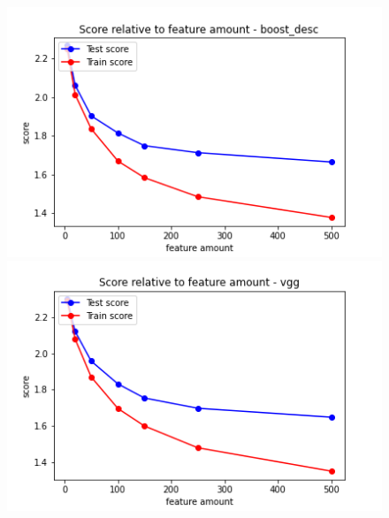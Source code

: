 \begin{figure}[H]
  \centering
  \begin{minipage}[b]{0.4\textwidth}
    \includegraphics[width=\textwidth]{images/2-LBM-feature_amount_boost_desc_small_values.png}
  \end{minipage}
  \hfill
  \begin{minipage}[b]{0.4\textwidth}
    \includegraphics[width=\textwidth]{images/2-LBM-feature_amount_vgg_small_values.png}
  \end{minipage}
\end{figure}

